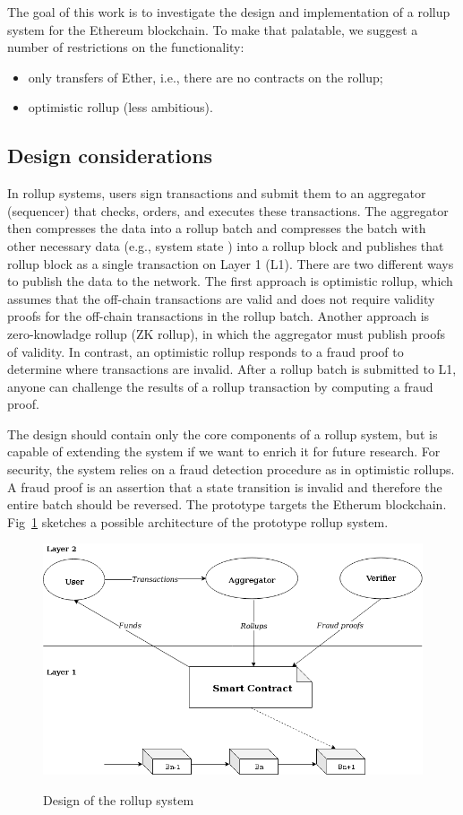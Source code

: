 \documentclass{article}
\begin{document}
The goal of this work is to investigate the design and implementation of a rollup system for the Ethereum blockchain. To make that palatable, we suggest a number of restrictions on the functionality:
\begin{itemize}
\item only transfers of Ether, i.e., there are no contracts on the rollup;
\item optimistic rollup (less ambitious).
\end{itemize}

\subsection{Design considerations}
\label{sec:design-consy}

In rollup systems, users sign transactions and submit them to an aggregator (sequencer) that checks, orders, and executes these transactions. The aggregator then compresses the data into a rollup batch and compresses the batch with other necessary data (e.g., system state ) into a rollup block and publishes that rollup block as a single transaction on Layer 1 (L1). There are two different ways to publish the data to the network. The first approach is optimistic rollup, which assumes that the off-chain transactions are valid and does not require validity proofs for the off-chain transactions in the rollup batch. Another approach is zero-knowladge rollup (ZK rollup), in which the aggregator must publish proofs of validity. In contrast, an optimistic rollup responds to a fraud proof to determine where transactions are invalid. After a rollup batch is submitted to L1, anyone can challenge the results of a rollup transaction by computing a fraud proof.

The design should contain only the core components of a rollup system, but is capable of extending
the system if we want to enrich it for future research. For security, the system relies on a fraud
detection procedure as in optimistic rollups. A fraud proof is an assertion that a state transition
is invalid and therefore the entire batch should be reversed. The prototype targets the Etherum
blockchain. Fig~\ref{rollup-design} sketches a possible architecture of the prototype rollup system.

\begin{figure}[t]
\caption{Design of the rollup system}
\includegraphics[width=12cm]{rollup-design.png}
\centering
\label{rollup-design}
\end{figure}
\end{document}
